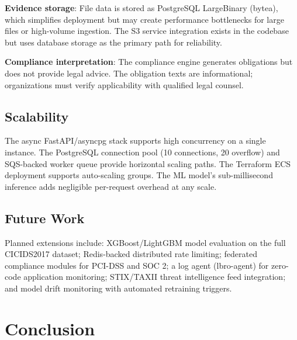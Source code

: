 \documentclass[conference]{IEEEtran}
\begin{document}
\textbf{Evidence storage}: File data is stored as PostgreSQL LargeBinary (bytea), which simplifies deployment but may create performance bottlenecks for large files or high-volume ingestion. The S3 service integration exists in the codebase but uses database storage as the primary path for reliability.

\textbf{Compliance interpretation}: The compliance engine generates obligations but does not provide legal advice. The obligation texts are informational; organizations must verify applicability with qualified legal counsel.

\subsection{Scalability}

The async FastAPI/asyncpg stack supports high concurrency on a single instance. The PostgreSQL connection pool (10 connections, 20 overflow) and SQS-backed worker queue provide horizontal scaling paths. The Terraform ECS deployment supports auto-scaling groups. The ML model's sub-millisecond inference adds negligible per-request overhead at any scale.

\subsection{Future Work}

Planned extensions include: XGBoost/LightGBM model evaluation on the full CICIDS2017 dataset; Redis-backed distributed rate limiting; federated compliance modules for PCI-DSS and SOC 2; a log agent (lbro-agent) for zero-code application monitoring; STIX/TAXII threat intelligence feed integration; and model drift monitoring with automated retraining triggers.

\section{Conclusion}
\end{document}
